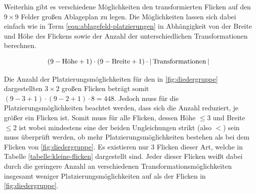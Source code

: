 Weiterhin gibt es verschiedene Möglichkeiten den transformierten Flicken auf den $9\times9$ Felder großen Ablageplan zu legen. Die Möglichkeiten lassen sich dabei einfach wie in Term \ref{eqn:ablagefeld-platzierungen} in Abhängigkeit von der Breite und Höhe des Flickens sowie der Anzahl der unterschiedlichen Transformationen berechnen.

\vspace*{-0.28cm}
\vspace*{-0.4cm}
\begin{equation}
    \label{eqn:ablagefeld-platzierungen}
    \left( 9 - \text{Höhe}  + 1 \right) \cdot
    \left( 9 - \text{Breite} + 1 \right) \cdot
    \left\lvert\, \text{Transformationen} \,\right\rvert
    \vspace*{-0.28cm}
\end{equation}

Die Anzahl der Platzierungsmöglichkeiten für den in \ref{fig:diedergruppe} dargestellten $3\times 2$ großen Flicken beträgt somit $\left( 9 - 3 + 1 \right) \cdot \left( 9 - 2 + 1 \right) \cdot 8 = 448$. Jedoch muss für die Platzierungsmöglichkeiten beachtet werden, dass sich die Anzahl reduziert, je größer ein Flicken ist. Somit muss für alle Flicken, dessen Höhe $\le 3$ und Breite $\le 2$ ist \textemdash{} wobei mindestens eine der beiden Ungleichungen strikt (also $<$) sein muss \textemdash{} überprüft werden, ob mehr Platzierungsmöglichkeiten bestehen als bei dem Flicken von \ref{fig:diedergruppe}. Es existieren nur 3 Flicken dieser Art, welche in Tabelle \ref{tabelle:kleine-flicken} dargestellt sind. Jeder dieser Flicken weißt dabei durch die geringere Anzahl an verschiedenen Transformationsmöglichkeiten insgesamt weniger Platzierungsmöglichkeiten auf als der Flicken in \ref{fig:diedergruppe}.

